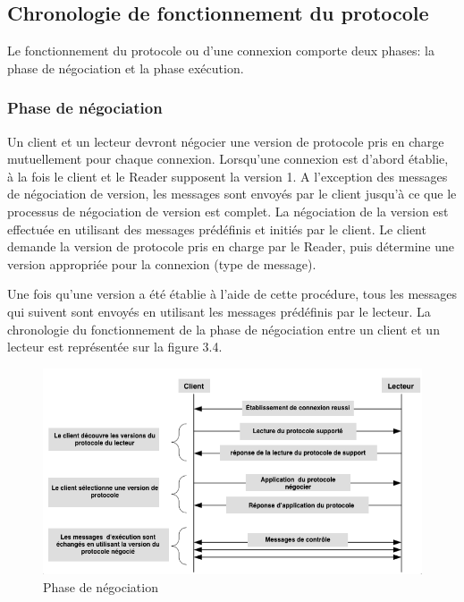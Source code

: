 \documentclass[11pt, a4paper, twoside]{book}
\begin{document}
\subsection{Chronologie de fonctionnement du protocole}
Le fonctionnement du protocole ou d'une connexion comporte deux phases: la phase de négociation et la phase exécution.
\subsubsection{Phase de négociation}
Un client et un lecteur devront négocier une version de protocole pris en charge mutuellement pour chaque connexion. Lorsqu'une connexion  est d'abord établie, à la fois le client et le Reader supposent  la version 1. A l'exception des messages de négociation de version, les messages sont envoyés par le client  jusqu'à ce que le processus de négociation de version est complet. La négociation de la version est effectuée en utilisant des messages prédéfinis et initiés par le client. Le client demande la version de protocole pris en charge par le Reader, puis détermine une version appropriée pour la connexion (type de message).
 
Une fois qu'une version a été établie à l'aide de cette procédure, tous les messages qui suivent sont envoyés en utilisant les messages prédéfinis par le lecteur. La chronologie du fonctionnement de la phase de négociation  entre un client et un lecteur est représentée sur la figure 3.4.
\begin{figure}[!h]
\centering
\includegraphics[width=\textwidth]{negotiation2}
\caption{Phase de négociation}
\end{figure}
\end{document}
